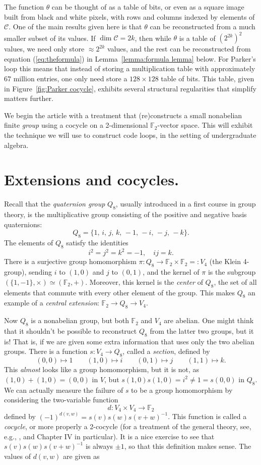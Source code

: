 \documentclass{article}
\theoremstyle{plain}
\theoremstyle{definition}
\def \cC {\mathcal{C}}
\def \FF {\mathbb{F}}
\begin{document}
The function $\theta$ can be thought of as a table of bits, or even as a square image built from black and white pixels, with rows and columns indexed by elements of $\cC$. 
One of the main results given here is that $\theta$ can be reconstructed from a much smaller subset of its values. 
If $\dim\cC = 2k$, then while $\theta$ is a table of $(2^{2k})^2$ values, we need only store $\approx 2^{2k}$ values, and the rest can be reconstructed from equation (\ref{eq:theformula}) in Lemma~\ref{lemma:formula lemma} below. 
For Parker's loop this means that instead of storing a multiplication table with approximately $67$ million entries, one only need store a $128\times 128$ table of bits. 
This table, given in Figure~\ref{fig:Parker cocycle}, exhibits several structural regularities that simplify matters further.


We begin the article with a treatment that (re)constructs a small nonabelian finite \emph{group} using a cocycle on a 2-dimensional $\FF_2$-vector space.
This will exhibit the technique we will use to construct code loops, in the setting of undergraduate algebra.


\section{Extensions and cocycles.}


Recall that the \emph{quaternion group} $Q_8$, usually introduced in a first course in group theory, is the multiplicative group consisting of the positive and negative basis quaternions:
\[
	Q_8 = \{1,\, i,\, j,\, k,\,-1,\, -i,\, -j,\, -k\}.
\]
The elements of $Q_8$ satisfy the identities
\[
	i^2 = j^2 = k^2 = -1, \quad ij=k.
\]
There is a surjective group homomorphism $\pi\colon Q_8 \to \FF_2 \times \FF_2 =: V_4$ (the Klein 4-group), sending $i$ to $(1,0)$ and $j$ to $(0,1)$, and the kernel of $\pi$ is the subgroup $(\{1,-1\},\times)\simeq (\FF_2,+)$.
Moreover, this kernel is the \emph{center} of $Q_8$, the set of all elements that commute with every other element of the group. This makes $Q_8$ an example of a \emph{central extension}: $\FF_2\to Q_8 \to V_4$.

Now $Q_8$ is a nonabelian group, but both $\FF_2$ and $V_4$ are abelian.
One might think that it shouldn't be possible to reconstruct $Q_8$ from the latter two groups, but it is! 
That is, if we are given some extra information that uses only the two abelian groups.
There is a function $s\colon V_4 \to Q_8$, called a \emph{section}, defined by 
\[
(0,0) \mapsto 1\qquad
(1,0) \mapsto i\qquad
(0,1) \mapsto j\qquad
(1,1) \mapsto k.
\]
This \emph{almost} looks like a group homomorphism, but it is not, as $(1,0) + (1,0) = (0,0)$ in $V$, but $s(1,0)s(1,0) = i^2 \not= 1 = s(0,0)$ in $Q_8$.
We can actually measure the failure of $s$ to be a group homomorphism by considering the two-variable function
\[
	d\colon V_4 \times V_4 \to \FF_2
\]
defined by $ (-1)^{d(v,w)} = s(v)s(w)s(v+w)^{-1}$. 
This function is called a \emph{cocycle}, or more properly a 2-cocycle (for a treatment of the general theory, see, e.g., \cite{Brown}, and Chapter IV in particular).
It is a nice exercise to see that $s(v)s(w)s(v+w)^{-1}$ is always $\pm 1$, so that this definition makes sense. The values of $d(v,w)$ are given as
\end{document}
